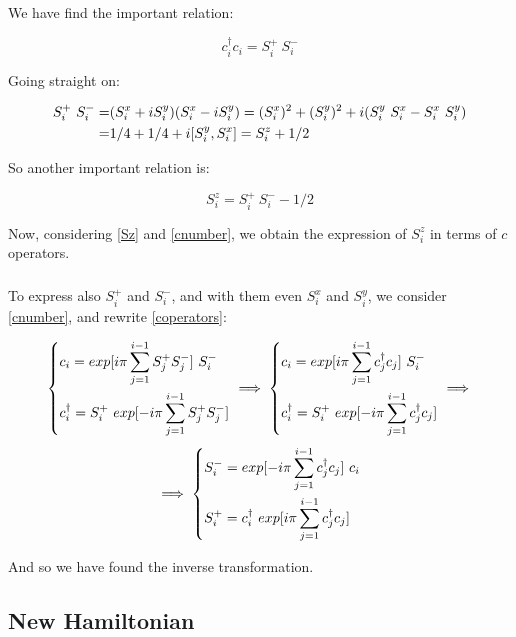 We have find the important relation:

\begin{equation}
c_i^\dagger c_i = S_i^+~S_i^-
\label{cnumber}
\end{equation}

Going straight on:

\begin{align*}
S_i^+~S_i^- =& (S_i^x + i S_i^y)(S_i^x - i S_i^y) = (S_i^x)^2 + (S_i^y)^2 + i(S_i^y~ S_i^x - S_i^x~ S_i^y) \\
=&1/4 + 1/4 + i\comm{S_i^y}{S_i^x} = S_i^z + 1/2
\end{align*}

So another important relation is:

\begin{equation}
S_i^z = S_i^+~S_i^- - 1/2
\label{Sz}
\end{equation}

\noindent Now, considering \cref{Sz} and \cref{cnumber}, we obtain the expression of $S_i^z$ in terms of $c$ operators.

\subparagraph{}To express also $S_i^+$ and $S_i^-$, and with them even $S_i^x$ and $S_i^y$, we consider \cref{cnumber}, and rewrite \cref{coperators}:

\begin{equation*}
\begin{dcases}
c_i = exp[i\pi \sum_{j=1}^{i-1} S_j^+ S_j^-]~S_i^-\\
c_i^\dagger = S_i^+~exp[-i\pi \sum_{j=1}^{i-1} S_j^+ S_j^-]
\end{dcases}
\implies
\begin{dcases}
c_i = exp[i\pi \sum_{j=1}^{i-1} c_j^\dagger c_j]~S_i^-\\
c_i^\dagger = S_i^+~exp[-i\pi \sum_{j=1}^{i-1} c_j^\dagger c_j]
\end{dcases}
\implies
\end{equation*}
\begin{equation*}
\implies
\begin{dcases}
S_i^- = exp[-i\pi \sum_{j=1}^{i-1} c_j^\dagger c_j]~c_i\\
S_i^+ = c_i^\dagger ~exp[i\pi \sum_{j=1}^{i-1} c_j^\dagger c_j]
\end{dcases}
\end{equation*}

\noindent And so we have found the inverse transformation.

\subsection{New Hamiltonian}


